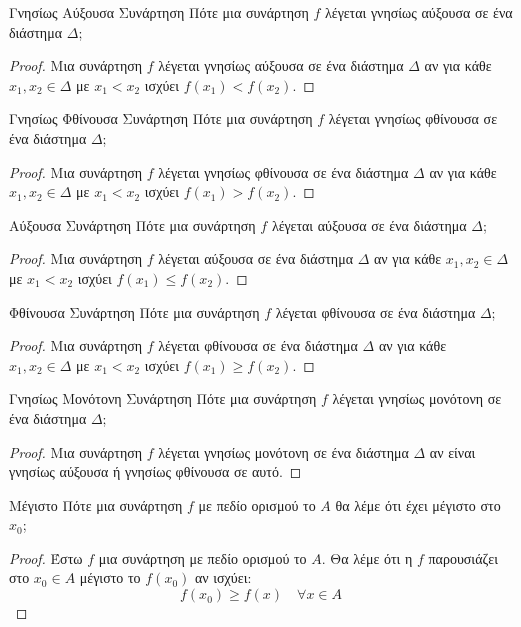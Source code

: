 \documentclass[a4paper, 12pt]{article}
\begin{document}
\begin{theorem}{Γνησίως Αύξουσα Συνάρτηση}
  Πότε μια συνάρτηση $f$ λέγεται γνησίως αύξουσα σε ένα διάστημα $Δ$;
\end{theorem}
\begin{proof}
  Μια συνάρτηση $f$ λέγεται γνησίως αύξουσα σε ένα διάστημα $Δ$ αν για κάθε $x_1, x_2 \in Δ$ με $x_1 < x_2$ ισχύει $f(x_1) < f(x_2)$.
\end{proof}

\begin{theorem}{Γνησίως Φθίνουσα Συνάρτηση}
  Πότε μια συνάρτηση $f$ λέγεται γνησίως φθίνουσα σε ένα διάστημα $Δ$;
\end{theorem}
\begin{proof}
  Μια συνάρτηση $f$ λέγεται γνησίως φθίνουσα σε ένα διάστημα $Δ$ αν για κάθε $x_1, x_2 \in Δ$ με $x_1 < x_2$ ισχύει $f(x_1) > f(x_2)$.
\end{proof}

\begin{theorem}{Αύξουσα Συνάρτηση}
  Πότε μια συνάρτηση $f$ λέγεται αύξουσα σε ένα διάστημα $Δ$;
\end{theorem}
\begin{proof}
  Μια συνάρτηση $f$ λέγεται αύξουσα σε ένα διάστημα $Δ$ αν για κάθε $x_1, x_2 \in Δ$ με $x_1 < x_2$ ισχύει $f(x_1) \leq f(x_2)$.
\end{proof}

\begin{theorem}{Φθίνουσα Συνάρτηση}
  Πότε μια συνάρτηση $f$ λέγεται φθίνουσα σε ένα διάστημα $Δ$;
\end{theorem}
\begin{proof}
  Μια συνάρτηση $f$ λέγεται φθίνουσα σε ένα διάστημα $Δ$ αν για κάθε $x_1, x_2 \in Δ$ με $x_1 < x_2$ ισχύει $f(x_1) \geq f(x_2)$.
\end{proof}

\begin{theorem}{Γνησίως Μονότονη Συνάρτηση}
  Πότε μια συνάρτηση $f$ λέγεται γνησίως μονότονη σε ένα διάστημα $Δ$;
\end{theorem}
\begin{proof}
  Μια συνάρτηση $f$ λέγεται γνησίως μονότονη σε ένα διάστημα $Δ$ αν είναι γνησίως αύξουσα ή γνησίως φθίνουσα σε αυτό.
\end{proof}

\begin{theorem}{Μέγιστο}
  Πότε μια συνάρτηση $f$ με πεδίο ορισμού το $A$ θα λέμε ότι έχει μέγιστο στο $x_0$;
\end{theorem}
\begin{proof}
  Έστω $f$ μια συνάρτηση με πεδίο ορισμού το $A$. Θα λέμε ότι η $f$ παρουσιάζει στο $x_0\in Α$ μέγιστο το $f(x_0)$ αν ισχύει:
  $$f(x_0) \geq f(x) \quad \forall x \in A$$
\end{proof}
\end{document}

